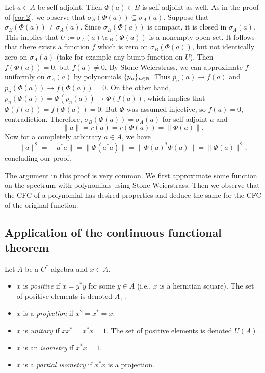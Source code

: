 \begin{myproof}
    Let $a \in A$ be self-adjoint. Then $\Phi (a) \in B$ is self-adjoint as well.
    As in the proof of \ref{cor:2}, we observe that $\sigma_B (\Phi (a)) \subseteq \sigma_A (a)$.
    Suppose that $\sigma_B (\Phi (a)) \neq \sigma_A (a)$.
    Since $\sigma_B (\Phi (a))$ is compact, it is closed in $\sigma_A (a)$. This implies that $U := \sigma_A (a) \setminus \sigma_B (\Phi (a))$
    is a nonempty open set. It follows that there exists a function $f$ which is zero on $\sigma_B (\Phi (a))$, but not identically zero on $\sigma_A (a)$
    (take for example any bump function on $U$). Then $f(\Phi(a)) = 0$, but $f(a) \neq 0$. By Stone-Weierstrass,
    we can approximate $f$ uniformly on $\sigma_A (a)$ by polynomials $\{ p_n \}_{n \in \mathbb {N}}$.
    Thus $p_n (a) \to f(a)$ and $p_n (\Phi (a)) \to f(\Phi (a)) = 0$.
    On the other hand, $ p_n (\Phi(a)) = \Phi (p_n (a)) \to \Phi (f(a))$,
    which implies that $\Phi (f(a)) = f(\Phi(a)) = 0.$
    But $\Phi$ was assumed injective, so $f(a) = 0$, contradiction.
    Therefore, $\sigma_B (\Phi (a)) = \sigma_A (a)$ for self-adjoint $a$ and
    $$\| a\| = r(a) = r(\Phi(a)) = \| \Phi(a)\|.$$
    Now for a completely arbitrary $a \in A$, we have 
    $$\| a\|^2 = \| a^* a\| = \| \Phi(a^* a)\| = \| \Phi(a)^* \Phi(a)\| = \| \Phi(a)\|^2,$$
    concluding our proof.
\end{myproof}

The argument in this proof is very common. We first approximate some function on the spectrum with polynomials 
    using Stone-Weierstrass. Then we observe that the CFC of a polynomial has desired properties 
    and deduce the same for the CFC of the original function.

\subsection{Application of the continuous functional theorem}

\begin{definition}
  Let $A$ be a $C^*$-algebra and $x \in A$.
  \begin{itemize}
    \item $x$ is \emph{positive} if $x = y^* y$ for some $y \in A$ (i.e., $x$ is a hernitian square). The set of positive elements is denoted $A_+$.
    \item $x$ is a \emph{projection} if $x^2 = x^* = x$.
    \item $x$ is \emph{unitary} if $x x^* = x^* x = 1$. The set of positive elements is denoted $U(A)$.
    \item $x$ is an \emph{isometry} if $x^* x = 1$.
    \item $x$ is a \emph{partial isometry} if $x^* x$ is a projection.
  \end{itemize}
\end{definition}

